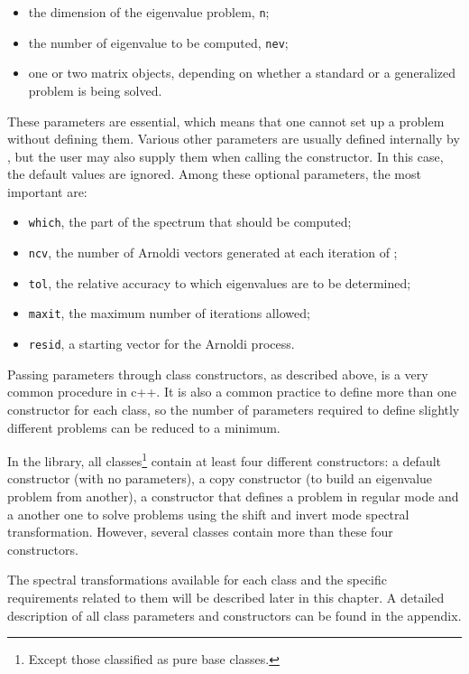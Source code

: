 \begin{itemize}
	\item the dimension of the eigenvalue problem, \texttt{n};
	\item the number of eigenvalue to be computed, \texttt{nev};
	\item one or two matrix objects, depending on whether a standard or a generalized problem is being solved.
\end{itemize}

These parameters are essential, which means that one cannot set up a problem without defining them. Various other parameters are usually defined internally by \ARPP{}, but the user may also supply them when calling the constructor. In this case, the default values are ignored. Among these optional parameters, the most important are:

\begin{itemize}
	\item \texttt{which}, the part of the spectrum that should be computed;
	\item \texttt{ncv}, the number of Arnoldi vectors generated at each iteration of \ARP{};
	\item \texttt{tol}, the relative accuracy to which eigenvalues are to be determined;
	\item \texttt{maxit}, the maximum number of iterations allowed;
	\item \texttt{resid}, a starting vector for the Arnoldi process.
\end{itemize}	

Passing parameters through class constructors, as described above, is a very common procedure in c++. It is also a common practice to define more than one constructor for each class, so the number of parameters required to define slightly different problems can be reduced to a minimum.

In the \ARPP{} library, all classes\footnote{Except those classified as pure base classes.} contain at least four different constructors: a default constructor (with no parameters), a copy constructor (to build an eigenvalue problem from another), a constructor that defines a problem in regular mode and a another one to solve problems using the shift and invert mode spectral transformation. However, several classes contain more than these four constructors.

The spectral transformations available for each class and the specific requirements related to them will be described later in this chapter. A detailed description of all \ARPP{} class parameters and constructors can be found in the appendix.

